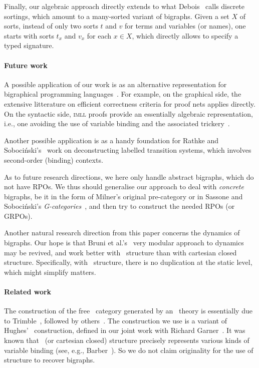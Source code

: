 \documentclass{llncs}
\newcommand{\imll}{\textsc{imll}}
\begin{document}
Finally, our algebraic approach directly extends to what
Debois~\cite{Debois:phd} calls discrete sortings, which amount to a
many-sorted variant of bigraphs. Given a set $X$ of sorts, instead of
only two sorts $t$ and $v$ for terms and variables (or names), one
starts with sorts $t_x$ and $v_x$ for each $x \in X$, which directly
allows to specify a typed signature.

\paragraph{Future work}
A possible application of our work is as an alternative representation
for bigraphical programming
languages~\cite{Damgaard:Matching}.  For example,
on the graphical side, the extensive litterature on efficient
correctness criteria for proof nets applies directly.  On the
syntactic side, \imll{} proofs provide an essentially algebraic
representation, i.e., one avoiding the use of variable binding and the
associated
trickery~\cite{PfenningElliott:hoas,PittsAM:newaas,hofmann:presheaf}.

Another possible application is as a handy foundation for Rathke and
\linebreak Soboci\'{n}ski's~\cite{modularLTS} work on deconstructing labelled
transition systems, which involves second-order (binding) contexts.

As to future research directions, we here only handle abstract
bigraphs, which do not have RPOs. We thus should generalise our
approach to deal with \emph{concrete} bigraphs, be it in the form of
Milner's original pre-category or in Sassone and Soboci\'{n}ski's
\emph{G-categories}~\cite{Sobocinski:grpos}, and then try to construct
the needed RPOs (or GRPOs).  

Another natural research direction from this paper concerns the
dynamics of bigraphs.  Our hope is that Bruni et
al.'s~\cite{Bruni:ccdc} very modular approach to dynamics may be
revived, and work better with \smc\ structure than with cartesian
closed structure. Specifically, with \smc\ structure, there is no
duplication at the static level, which might simplify matters.

\paragraph{Related work}
The construction of the free \smc\ category generated by an \smc\
theory is essentially due to Trimble~\cite{Trimble:phd}, followed by
others~\cite{Tan:phd,Hughes:freestar,Lamarche:nets}.  The construction
we use is a variant of Hughes'~\cite{Hughes:freestar} construction,
defined in our joint work with Richard Garner~\cite{GHP}.  It was
known that \smc\ (or cartesian closed) structure precisely represents
various kinds of variable binding (see, e.g.,
Barber~\cite{Barber:action}).  So we do not claim originality for the
use of \smc{} structure to recover bigraphs.
\end{document}
